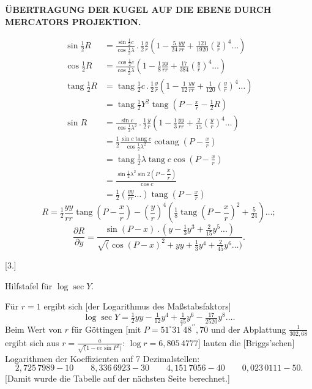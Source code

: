 \par\clearpage
\noindent\null\hfill{\fontsize{8}{10}\selectfont\textbf{ÜBERTRAGUNG DER KUGEL AUF DIE EBENE DURCH MERCATORS PROJEKTION.}}\hfill{}\par\medskip

\[
\begin{aligned}
\sin\tfrac12R
 &=\frac{\sin\tfrac12 c}{\cos\tfrac12\lambda}\,.\,\tfrac12\frac yr
 \left(1-\tfrac5{24}\frac{yy}{rr}+\tfrac{121}{1920}\left(\frac yr\right)^4\ldots\right)\\
\cos\tfrac12R
 &=\frac{\cos\tfrac12 c}{\cos\tfrac12\lambda}
 \left(1-\tfrac18\frac{yy}{rr}+\tfrac{17}{384}\left(\frac yr\right)^4\ldots\right)\\
\operatorname{tang}\tfrac12R
 &=\operatorname{tang}\tfrac12c\,.\,\tfrac12\frac yr
 \left(1-\tfrac1{12}\frac{yy}{rr}+\tfrac1{120}\left(\frac yr\right)^4\ldots\right)\\
 &=\operatorname{tang}\tfrac12Y^2\operatorname{tang}\left(P-\frac xr-\tfrac12R\right)\\
\sin R&=\frac{\sin c}{\cos\tfrac12\lambda^2}\,.\,\tfrac12\frac yr
 \left(1-\tfrac13\frac{yy}{rr}+\tfrac2{15}\left(\frac yr\right)^4\ldots\right)\\
 &=\tfrac12\frac{\sin c\operatorname{tang}c}{\cos\tfrac12\lambda^2}
 \operatorname{cotang}\left(P-\frac xr\right)\\
 &=\operatorname{tang}\tfrac12\lambda\operatorname{tang}c\cos\left(P-\frac xr\right)\\
 &=\frac{\sin\tfrac12\lambda^2\sin2\left(P-\dfrac xr\right)}{\cos c}\\
 &=\tfrac12\left(\frac{yy}{rr}\ldots\right)\operatorname{tang}\left(P-\frac xr\right)
\end{aligned}
\]
\[
R=\tfrac12\frac{yy}{rr}\operatorname{tang}\left(P-\frac xr\right)
 -\left(\frac yr\right)^4\left(\tfrac18\operatorname{tang}\left(P-\frac xr\right)^2+\tfrac5{24}\right)\ldots;
\]
\noindent [für \(r=1\) gilt]
\[
\frac{\partial R}{\partial y}=
\frac{\sin(P-x)\,.\,(y-\tfrac13y^3+\tfrac2{15}y^5\ldots)}
{\surd(\cos(P-x)^2+yy+\tfrac13y^4+\tfrac2{45}y^6\ldots)}.
\]

\begin{center}
[3.]\par\medskip
Hilfstafel für \(\log\sec Y\).
\end{center}
Für \(r=1\) ergibt sich [der Logarithmus des Maßstabsfaktors]
\[
\log\sec Y=\tfrac12 yy-\tfrac1{12}y^4+\tfrac1{45}y^6-\tfrac{17}{2520}y^8\ldots.
\]
Beim Wert von \(r\) für Göttingen [mit \(P=51^\circ31^{\prime}48^{\prime\prime}{,}70\)
und der Abplattung \(\frac1{302{,}68}\) ergibt sich aus
\(r=\frac a{\surd(1-ee\sin P^2)}\): \(\log r=6{,}805\,4777\)] lauten
die [Briggs'schen] Logarithmen der Koeffizienten auf 7 Dezimalstellen:
\[
2{,}725\,7989-10\qquad 8{,}336\,6923-30\qquad
4{,}151\,7056-40\qquad 0{,}023\,0111-50.
\]
[Damit wurde die Tabelle auf der nächsten Seite berechnet.]

